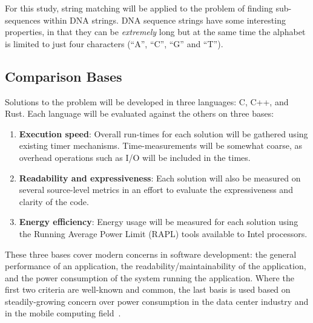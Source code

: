 For this study, string matching will be applied to the problem of finding sub-sequences within DNA strings. DNA sequence strings have some interesting properties, in that they can be \textit{extremely} long but at the same time the alphabet is limited to just four characters (``A'', ``C'', ``G'' and ``T'').

\subsection{Comparison Bases}
\label{subsec:comparison}

Solutions to the problem will be developed in three languages: C, C++, and Rust. Each language will be evaluated against the others on three bases:

\begin{enumerate}
\item \textbf{Execution speed}: Overall run-times for each solution will be gathered using existing timer mechanisms. Time-measurements will be somewhat coarse, as overhead operations such as I/O will be included in the times.
\item \textbf{Readability and expressiveness}: Each solution will also be measured on several source-level metrics in an effort to evaluate the expressiveness and clarity of the code.
\item \textbf{Energy efficiency}: Energy usage will be measured for each solution using the Running Average Power Limit (RAPL) tools available to Intel processors.
\end{enumerate}

These three bases cover modern concerns in software development: the general performance of an application, the readability/maintainability of the application, and the power consumption of the system running the application. Where the first two criteria are well-known and common, the last basis is used based on steadily-growing concern over power consumption in the data center industry and in the mobile computing field~\cite{pereira.et.al.2017}.
